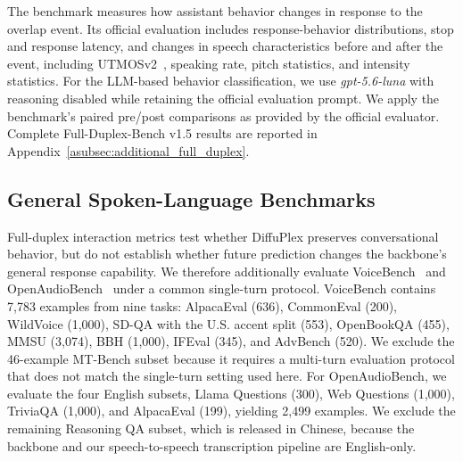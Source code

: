 The benchmark measures how assistant behavior changes in response to the overlap event.
Its official evaluation includes response-behavior distributions, stop and response latency, and changes in speech characteristics before and after the event, including UTMOSv2~\citep{10832315}, speaking rate, pitch statistics, and intensity statistics.
For the LLM-based behavior classification, we use \textit{gpt-5.6-luna} with reasoning disabled while retaining the official evaluation prompt.
We apply the benchmark's paired pre/post comparisons as provided by the official evaluator.
Complete Full-Duplex-Bench v1.5 results are reported in Appendix~\ref{asubsec:additional_full_duplex}.


\subsection{General Spoken-Language Benchmarks}
\label{asubsec:general_benchmarks}

Full-duplex interaction metrics test whether DiffuPlex preserves conversational behavior, but do not establish whether future prediction changes the backbone's general response capability.
We therefore additionally evaluate VoiceBench~\citep{chen-etal-2026-voicebench} and OpenAudioBench~\citep{li2025baichuanaudiounifiedframeworkendtoend} under a common single-turn protocol.
VoiceBench contains 7,783 examples from nine tasks: AlpacaEval (636), CommonEval (200), WildVoice (1,000), SD-QA with the U.S. accent split (553), OpenBookQA (455), MMSU (3,074), BBH (1,000), IFEval (345), and AdvBench (520).
We exclude the 46-example MT-Bench subset because it requires a multi-turn evaluation protocol that does not match the single-turn setting used here.
For OpenAudioBench, we evaluate the four English subsets, Llama Questions (300), Web Questions (1,000), TriviaQA (1,000), and AlpacaEval (199), yielding 2,499 examples.
We exclude the remaining Reasoning QA subset, which is released in Chinese, because the backbone and our speech-to-speech transcription pipeline are English-only.

